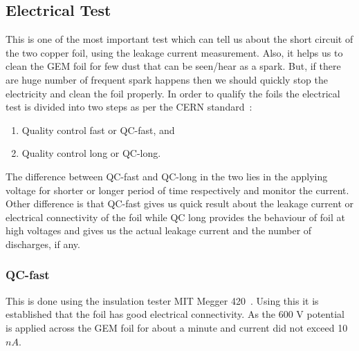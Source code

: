 \subsection{Electrical Test} %
\label{sub:electrical_test}
This is one of the most important test which can tell us about the short circuit of the two copper foil, using the leakage current measurement. Also, it helps us to clean the GEM foil for few dust that can be seen/hear as a spark. But, if there are huge number of frequent spark happens then we should quickly stop the electricity and clean the foil properly. In order to qualify the foils the electrical test is divided into two steps as per the CERN standard~\cite{Abbaneo2015}:
\begin{enumerate}
    \item Quality control fast or QC-fast, and
    \item Quality control long or QC-long.
\end{enumerate}
The difference between QC-fast and QC-long in the two lies in the applying voltage for shorter or longer period of time respectively and monitor the current. Other difference is that QC-fast gives us quick result about the leakage current or electrical connectivity of the foil while QC long provides the behaviour of foil at high voltages and gives us the actual leakage current and the number of discharges, if any.
\subsubsection{QC-fast} %
\label{ssub:qc_fast}
This is done using the insulation tester MIT Megger 420~\cite{twelve}. Using this it is established that the foil has good electrical connectivity. As the 600 V potential is applied across the GEM foil for about a minute and current did not exceed 10 $nA$.

